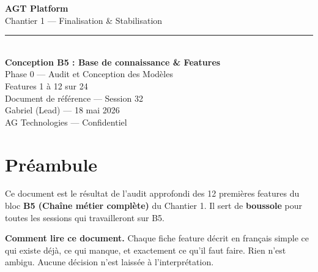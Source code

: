 \documentclass[11pt,a4paper]{article}
\newcommand{\chantier}[1]{\textbf{\color{AGTPrimary}#1}}
\begin{document}
\begin{titlepage}
  \pagecolor{AGTDark}
  \color{white}
  \vspace*{3cm}
  \begin{center}
    {\Huge\bfseries AGT Platform}\\[0.6em]
    {\LARGE Chantier 1 — Finalisation \& Stabilisation}\\[2em]
    \color{AGTPrimary}
    \rule{0.6\textwidth}{2pt}\\[1.5em]
    \color{white}
    {\Large\bfseries Conception B5 : Base de connaissance \& Features}\\[0.5em]
    {\large Phase 0 — Audit et Conception des Modèles}\\[0.5em]
    {\large\color{AGTGray} Features 1 à 12 sur 24}\\[3em]
    \color{AGTGray}
    {\normalsize Document de référence — Session 32}\\[0.3em]
    {\normalsize Gabriel (Lead) — 18 mai 2026}\\[0.3em]
    {\normalsize AG Technologies — Confidentiel}
  \end{center}
  \vfill
  \begin{center}
    \color{AGTGray}{\small Suite : features 13 à 24 dans le prochain document}
  \end{center}
\end{titlepage}
\nopagecolor

\tableofcontents
\newpage

\section{Préambule}

Ce document est le résultat de l'audit approfondi des 12 premières features du bloc
\chantier{B5 (Chaîne métier complète)} du Chantier 1. Il sert de \textbf{boussole}
pour toutes les sessions qui travailleront sur B5.

\begin{notebox}
\textbf{Comment lire ce document.}
Chaque fiche feature décrit en français simple ce qui existe déjà, ce qui manque, et
exactement ce qu'il faut faire. Rien n'est ambigu. Aucune décision n'est laissée à
l'interprétation.
\end{notebox}
\end{document}
